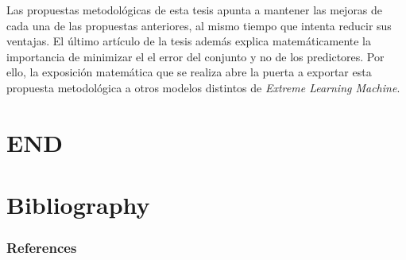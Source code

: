 \documentclass{beamer}
\begin{document}
{Las propuestas metodológicas de esta tesis apunta a mantener las mejoras de cada una de las propuestas anteriores, al mismo tiempo que intenta reducir sus ventajas. El último artículo de la tesis \cite{gncelm} además explica matemáticamente la importancia de minimizar el el error del conjunto y no de los predictores. Por ello, la exposición matemática que se realiza abre la puerta a exportar esta propuesta metodológica a otros modelos distintos de \textit{Extreme Learning Machine}.

}


\section*{END}

\section*{Bibliography}
\begin{frame}[allowframebreaks]
	\frametitle{References}
    
	
\end{frame}
\end{document}
